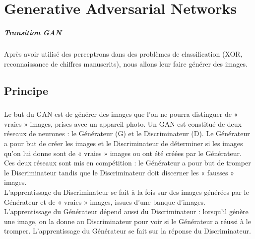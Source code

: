 


\chapter{Generative Adversarial Networks}

\paragraph{Transition GAN}
Après avoir utilisé des perceptrons dans des problèmes de classification (XOR, reconnaissance de chiffres manuscrits), nous allons leur faire générer des images.

\section{Principe}
\paragraph{}
Le but du GAN est de générer des images que l’on ne pourra distinguer de « vraies » images, prises avec un appareil photo. Un GAN est constitué de deux réseaux de neurones : le Générateur (G) et le Discriminateur (D). Le Générateur a pour but de créer les images et le Discriminateur de déterminer si les images qu’on lui donne sont de « vraies » images ou ont été créées par le Générateur. Ces deux réseaux sont mis en compétition : le Générateur a pour but de tromper le Discriminateur tandis que le Discriminateur doit discerner les « fausses » images.\\
L’apprentissage du Discriminateur se fait à la fois sur des images générées par le Générateur et de « vraies » images, issues d’une banque d’images.\\
L’apprentissage du Générateur dépend aussi du Discriminateur : lorsqu’il génère une image, on la donne au Discriminateur pour voir si le Générateur a réussi à le tromper. L’apprentissage du Générateur se fait sur la réponse du Discriminateur.

